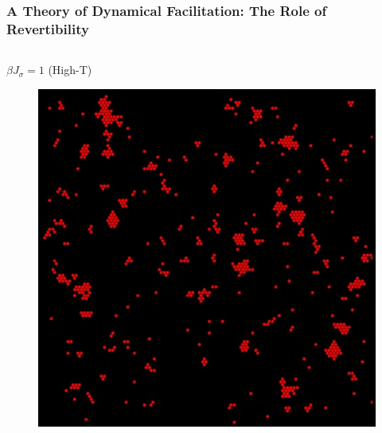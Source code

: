 \documentclass[9pt,professionalfont,t,aspectratio=169]{beamer}
\begin{document}


\begin{frame}
\frametitle{A Theory of Dynamical Facilitation: The Role of Revertibility}

\begin{columns}[T]
\begin{column}[T]{0.6\textwidth}
\centering $\beta J_\sigma = 1$ (High-T)
\begin{figure}[t]

\begin{overprint}
\centering\includegraphics[width=0.825\textheight]{d.6-fac_results_3/persistlowT.jpg}


\end{overprint}
\end{figure}
\end{column}
\end{columns}
\end{frame}
\end{document}
